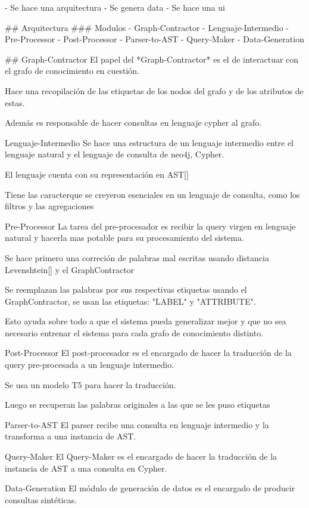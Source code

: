 - Se hace una arquitectura
- Se genera data
- Se hace una ui

## Arquitectura
### Modulos
- Graph-Contractor
- Lenguaje-Intermedio
- Pre-Processor
- Post-Processor
- Parser-to-AST
- Query-Maker
- Data-Generation


## Graph-Contractor
El papel del *Graph-Contractor* es el de interactuar con el grafo de conocimiento en cuesti\'on. 

Hace una recopilaci\'on de las etiquetas de los nodos del grafo y de los atributos de estas. 

Adem\'as es responsable de hacer consultas en lenguaje cypher al grafo. 

Lenguaje-Intermedio
Se hace una estructura de un lenguaje intermedio entre el lenguaje natural y el lenguaje de consulta de neo4j, Cypher.

El lenguaje cuenta con su representaci\'on en AST[]

Tiene las caracter\isticas que se creyeron esenciales en un lenguaje de consulta, como los filtros y las agregaciones

Pre-Processor
La tarea del pre-procesador es recibir la query virgen en lenguaje natural y hacerla mas potable para su procesamiento del sistema.

Se hace primero una correci\'on de palabras mal escritas usando distancia Levenshtein[] y el GraphContractor

Se reemplazan las palabras por sus respectivas etiquetas usando el GraphContractor, se usan las etiquetas: "LABEL" y "ATTRIBUTE". 

Esto ayuda sobre todo a que el sistema pueda generalizar mejor y que no sea necesario entrenar el sistema para cada grafo de conocimiento distinto.

Post-Processor
El post-procesador es el encargado de hacer la traducci\'on de la query pre-procesada a un lenguaje intermedio.

Se usa un modelo T5 para hacer la traducci\'on.

Luego se recuperan las palabras originales a las que se les puso etiquetas


Parser-to-AST
El parser recibe una consulta en lenguaje intermedio y la transforma a una instancia de AST.

Query-Maker
El Query-Maker es el encargado de hacer la traducci\'on de la instancia de AST a una consulta en Cypher.

Data-Generation
El m\'odulo de generaci\'on de datos es el encargado de producir consultas sint\'eticas.

